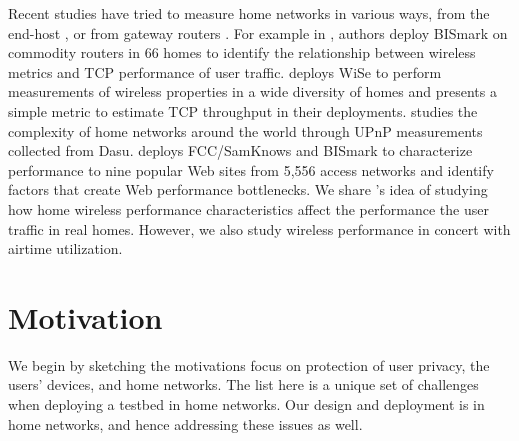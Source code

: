 Recent studies have tried to measure home networks in various ways, from the end-host \cite{chetty2011my,dicioccio2012probe,sanchez2013trying}, or from gateway routers \cite{grover2013peeking,sundaresan2015measuring,patro2013observing,sundaresan2013measuring,pefkianakis2015characterizing}. For example in \cite{sundaresan2015measuring}, authors deploy BISmark on commodity routers in 66 homes to identify the relationship between wireless metrics and TCP performance of user traffic. \cite{patro2013observing} deploys WiSe to perform measurements of wireless properties in a wide diversity of homes and presents a simple metric to estimate TCP throughput in their deployments. \cite{sanchez2013trying} studies the complexity of home networks around the world through UPnP measurements collected from Dasu. \cite{sundaresan2013measuring} deploys FCC/SamKnows and BISmark to characterize performance to nine popular Web sites from 5,556 access networks and identify factors that create Web performance bottlenecks. We share \cite{sundaresan2015measuring}'s idea of studying how home wireless performance characteristics affect the performance the user traffic in real homes. However, we also study wireless performance in concert with airtime utilization.

\section{Motivation}
\label{sec.motivation}
We begin by sketching the motivations focus on protection of user privacy, the users' devices, and home networks. The list here is a unique set of challenges when deploying a testbed in home networks. Our design and deployment is in home networks, and hence addressing these issues as well.

